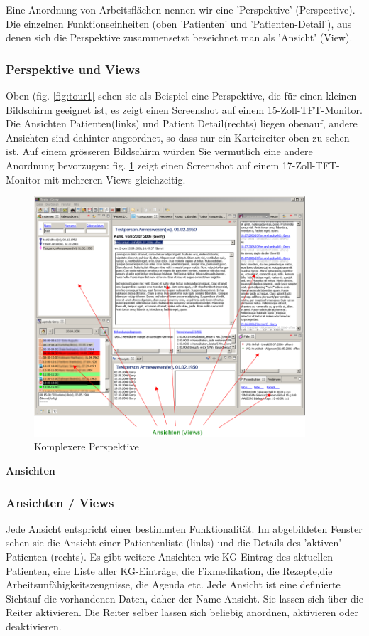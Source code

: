 Eine Anordnung von Arbeitsflächen nennen wir eine 'Perspektive' (Perspective). Die einzelnen Funktionseinheiten
(oben 'Patienten' und 'Patienten-Detail'), aus denen sich die Perspektive zusammensetzt bezeichnet
man als 'Ansicht' (View).

\subsubsection{Perspektive und Views}

Oben (fig. \ref{fig:tour1} sehen sie als Beispiel eine Perspektive, die für
einen kleinen Bildschirm geeignet ist, es zeigt einen
Screenshot auf einem 15-Zoll-TFT-Monitor. Die Ansichten \glqq
Patienten\grqq{}(links) und \glqq Patient Detail\grqq{}(rechts) liegen obenauf,
andere Ansichten sind dahinter angeordnet, so dass nur ein Karteireiter oben
zu sehen ist.
Auf einem grösseren Bildschirm würden Sie vermutlich eine andere Anordnung
bevorzugen: fig. \ref{fig:tour2} zeigt einen Screenshot auf einem
17-Zoll-TFT-Monitor mit mehreren Views gleichzeitig.

\begin{figure}[htp]
\begin{center}
  \includegraphics[width=0.9\textwidth]{images/tour2}
  \caption{Komplexere Perspektive}
  \label{fig:tour2}
\end{center}
\end{figure}
\textbf{Ansichten}

\subsubsection{Ansichten / Views}
Jede Ansicht entspricht einer bestimmten Funktionalität. Im abgebildeten Fenster sehen sie die Ansicht einer
Patientenliste (links) und die Details des 'aktiven' Patienten (rechts). Es gibt weitere Ansichten wie KG-Eintrag des aktuellen Patienten, eine Liste aller KG-Einträge, die Fixmedikation, die Rezepte,die Arbeitsunfähigkeitszeugnisse,
die Agenda etc. Jede Ansicht ist eine definierte \glqq Sicht\grqq auf die vorhandenen Daten,
daher der Name \glqq Ansicht\grqq. Sie lassen sich über die Reiter aktivieren. Die
Reiter selber lassen sich beliebig anordnen, aktivieren oder deaktivieren.

